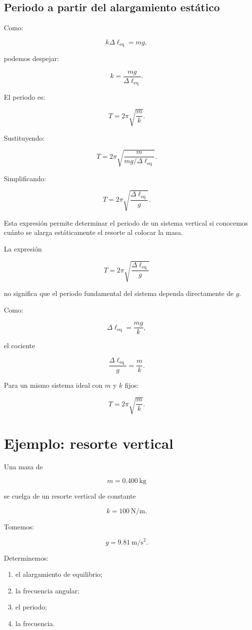 \subsection{Periodo a partir del alargamiento estático}

Como:

\[ k\Delta\ell_{\mathrm{eq}}=mg, \]

podemos despejar:

\[ k=\frac{mg}{\Delta\ell_{\mathrm{eq}}}. \]

El periodo es:

\[ T=2\pi\sqrt{\frac{m}{k}}. \]

Sustituyendo:

\[
T
=
2\pi
\sqrt{
\frac{m}
{mg/\Delta\ell_{\mathrm{eq}}}
}.
\]

Simplificando:

\[ \boxed{T=2\pi\sqrt{\frac{\Delta\ell_{\mathrm{eq}}}{g}}}. \]

Esta expresión permite determinar el periodo de un sistema vertical si conocemos cuánto se alarga estáticamente el resorte al colocar la masa.

\begin{advertencia}
La expresión

\[ T=2\pi\sqrt{\frac{\Delta\ell_{\mathrm{eq}}}{g}} \]

no significa que el periodo fundamental del sistema dependa directamente de \(g\).

Como:

\[ \Delta\ell_{\mathrm{eq}}=\frac{mg}{k}, \]

el cociente

\[ \frac{\Delta\ell_{\mathrm{eq}}}{g}=\frac{m}{k}. \]

Para un mismo sistema ideal con \(m\) y \(k\) fijos:

\[ T=2\pi\sqrt{\frac{m}{k}}. \]
\end{advertencia}


\section{Ejemplo: resorte vertical}

\begin{ejemplo}
Una masa de

\[ m=\SI{0.400}{\kilogram} \]

se cuelga de un resorte vertical de constante

\[ k=\SI{100}{\newton\per\meter}. \]

Tomemos:

\[ g=\SI{9.81}{\meter\per\second\squared}. \]

Determinemos:

\begin{enumerate}[label=\alph*)]
    \item el alargamiento de equilibrio;
    \item la frecuencia angular;
    \item el periodo;
    \item la frecuencia.
\end{enumerate}
\end{ejemplo}


